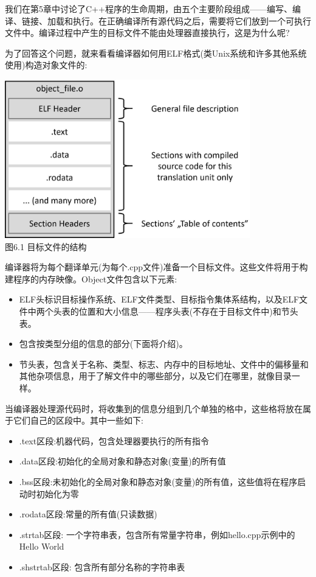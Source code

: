 我们在第5章中讨论了C++程序的生命周期，由五个主要阶段组成——编写、编译、链接、加载和执行。在正确编译所有源代码之后，需要将它们放到一个可执行文件中。编译过程中产生的目标文件不能由处理器直接执行，这是为什么呢?

为了回答这个问题，就来看看编译器如何用ELF格式(类Unix系统和许多其他系统使用)构造对象文件的:

\begin{center}
\includegraphics[width=0.8\textwidth]{content/2/chapter6/images/1.jpg}\\
图6.1 目标文件的结构
\end{center}

编译器将为每个翻译单元(为每个.cpp文件)准备一个目标文件。这些文件将用于构建程序的内存映像。Object文件包含以下元素:

\begin{itemize}
\item 
ELF头标识目标操作系统、ELF文件类型、目标指令集体系结构，以及ELF文件中两个头表的位置和大小信息——程序头表(不存在于目标文件中)和节头表。

\item 
包含按类型分组的信息的部分(下面将介绍)。

\item 
节头表，包含关于名称、类型、标志、内存中的目标地址、文件中的偏移量和其他杂项信息，用于了解文件中的哪些部分，以及它们在哪里，就像目录一样。
\end{itemize}

当编译器处理源代码时，将收集到的信息分组到几个单独的格中，这些格将放在属于它们自己的区段中。其中一些如下:

\begin{itemize}
\item 
.text区段:机器代码，包含处理器要执行的所有指令

\item 
.data区段:初始化的全局对象和静态对象(变量)的所有值

\item 
.bss区段:未初始化的全局对象和静态对象(变量)的所有值，这些值将在程序启动时初始化为零

\item 
.rodata区段:常量的所有值(只读数据)

\item 
.strtab区段: 一个字符串表，包含所有常量字符串，例如hello.cpp示例中的Hello World

\item 
.shstrtab区段: 包含所有部分名称的字符串表
\end{itemize}

